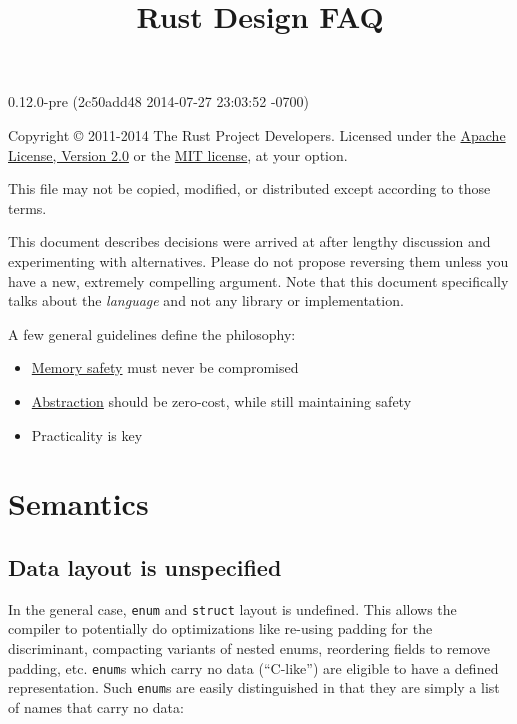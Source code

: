 \documentclass[]{article}
\title{Rust Design FAQ}
\begin{document}
\maketitle

0.12.0-pre (2c50add48 2014-07-27 23:03:52 -0700)

Copyright © 2011-2014 The Rust Project Developers. Licensed under the
\href{http://www.apache.org/licenses/LICENSE-2.0}{Apache License,
Version 2.0} or the \href{http://opensource.org/licenses/MIT}{MIT
license}, at your option.

This file may not be copied, modified, or distributed except according
to those terms.

{
\hypersetup{linkcolor=black}
\setcounter{tocdepth}{3}
\tableofcontents
}
This document describes decisions were arrived at after lengthy
discussion and experimenting with alternatives. Please do not propose
reversing them unless you have a new, extremely compelling argument.
Note that this document specifically talks about the \emph{language} and
not any library or implementation.

A few general guidelines define the philosophy:

\begin{itemize}
\itemsep1pt\parskip0pt
\item
  \href{http://en.wikipedia.org/wiki/Memory_safety}{Memory safety} must
  never be compromised
\item
  \href{http://en.wikipedia.org/wiki/Abstraction_\%28computer_science\%29}{Abstraction}
  should be zero-cost, while still maintaining safety
\item
  Practicality is key
\end{itemize}

\section{Semantics}\label{semantics}

\subsection{Data layout is
unspecified}\label{data-layout-is-unspecified}

In the general case, \texttt{enum} and \texttt{struct} layout is
undefined. This allows the compiler to potentially do optimizations like
re-using padding for the discriminant, compacting variants of nested
enums, reordering fields to remove padding, etc. \texttt{enum}s which
carry no data (``C-like'') are eligible to have a defined
representation. Such \texttt{enum}s are easily distinguished in that
they are simply a list of names that carry no data:
\end{document}
